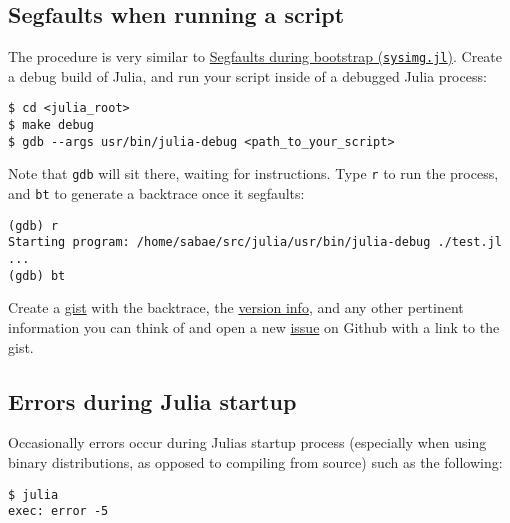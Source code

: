 \hypertarget{17337880191991868567}{}


\subsection{Segfaults when running a script}



The procedure is very similar to \hyperlink{13671941627037387928}{Segfaults during bootstrap (\texttt{sysimg.jl})}.  Create a debug build of Julia, and run your script inside of a debugged Julia process:




\begin{lstlisting}
$ cd <julia_root>
$ make debug
$ gdb --args usr/bin/julia-debug <path_to_your_script>
\end{lstlisting}



Note that \texttt{gdb} will sit there, waiting for instructions.  Type \texttt{r} to run the process, and \texttt{bt} to generate a backtrace once it segfaults:




\begin{lstlisting}
(gdb) r
Starting program: /home/sabae/src/julia/usr/bin/julia-debug ./test.jl
...
(gdb) bt
\end{lstlisting}



Create a \href{https://gist.github.com}{gist} with the backtrace, the \hyperlink{4601189142062189569}{version info}, and any other pertinent information you can think of and open a new \href{https://github.com/JuliaLang/julia/issues?q=is\%3Aopen}{issue} on Github with a link to the gist.



\hypertarget{8599391806074935874}{}


\subsection{Errors during Julia startup}



Occasionally errors occur during Julia{\textquotesingle}s startup process (especially when using binary distributions, as opposed to compiling from source) such as the following:




\begin{verbatim}
$ julia
exec: error -5
\end{verbatim}



